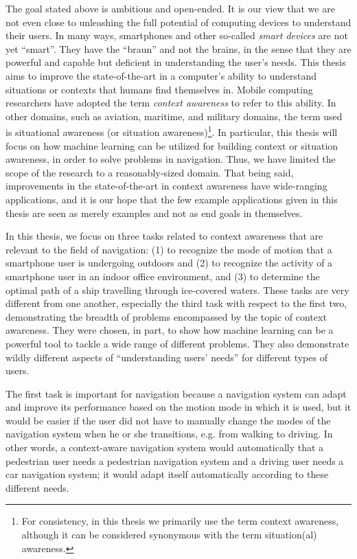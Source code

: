 The goal stated above is ambitious and open-ended. It is our view that we are not even close to unleashing the full potential of computing devices to understand their users. In many ways, smartphones and other so-called \emph{smart devices} are not yet ``smart''. They have the ``braun'' and not the brains, in the sense that they are powerful and capable but deficient in understanding the user's needs. This thesis aims to improve the state-of-the-art in a computer's ability to understand situations or contexts that humans find themselves in. Mobile computing researchers have adopted the term \emph{context awareness} to refer to this ability. In other domains, such as aviation, maritime, and military domains, the term used is situational awareness (or situation awareness)\footnote{For consistency, in this thesis we primarily use the term context awareness, although it can be considered synonymous with the term situation(al) awareness.}. In particular, this thesis will focus on how machine learning can be utilized for building context or situation awareness, in order to solve problems in navigation. Thus, we have limited the scope of the research to a reasonably-sized domain. That being said, improvements in the state-of-the-art in context awareness have wide-ranging applications, and it is our hope that the few example applications given in this thesis are seen as merely examples and not as end goals in themselves.

In this thesis, we focus on three tasks related to context awareness that are relevant to the field of navigation: (1) to recognize the mode of motion that a smartphone user is undergoing outdoors and (2) to recognize the activity of a smartphone user in an indoor office environment, and (3) to determine the optimal path of a ship travelling through ice-covered waters. These tasks are very different from one another, especially the third task with respect to the first two, demonstrating the breadth of problems encompassed by the topic of context awareness. They were chosen, in part, to show how machine learning can be a powerful tool to tackle a wide range of different problems. They also demonstrate wildly different aspects of ``understanding users' needs'' for different types of users.

The first task is important for navigation because a navigation system can adapt and improve its performance based on the motion mode in which it is used, but it would be easier if the user did not have to manually change the modes of the navigation system when he or she transitions, e.g. from walking to driving. In other words, a context-aware navigation system would automatically that a pedestrian user needs a pedestrian navigation system and a driving user needs a car navigation system; it would adapt itself automatically according to these different needs.

